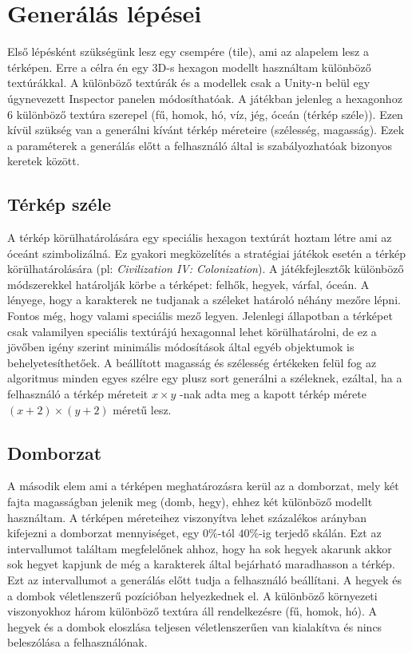 \section{Generálás lépései}

Első lépésként szükségünk lesz egy csempére (tile), ami az alapelem lesz a térképen. Erre a célra én egy 3D-s hexagon modellt használtam különböző textúrákkal. A különböző textúrák és a modellek csak a Unity-n belül egy úgynevezett Inspector panelen módosíthatóak. A játékban jelenleg a hexagonhoz 6 különböző textúra szerepel (fű, homok, hó, víz, jég, óceán (térkép széle)).
\newline
\newline Ezen kívül szükség van a generálni kívánt térkép méreteire (szélesség, magasság). Ezek a paraméterek a generálás előtt a felhasználó által is szabályozhatóak bizonyos keretek között.

\subsection{Térkép széle}

A térkép körülhatárolására egy speciális hexagon textúrát hoztam létre ami az óceánt szimbolizálná. Ez gyakori megközelítés a stratégiai játékok esetén a térkép körülhatárolására (pl: \textit{Civilization IV: Colonization}). A játékfejlesztők különböző módszerekkel határolják körbe a térképet: felhők, hegyek, várfal, óceán. A lényege, hogy a karakterek ne tudjanak a széleket határoló néhány mezőre lépni. Fontos még, hogy valami speciális mező legyen.
\newline
\newline Jelenlegi állapotban a térképet csak valamilyen speciális textúrájú hexagonnal lehet körülhatárolni, de ez a jövőben igény szerint minimális módosítások által egyéb objektumok is behelyetesíthetőek. 
\newline
\newline A beállított magasság és szélesség értékeken felül fog az algoritmus minden egyes szélre egy plusz sort generálni a széleknek, ezáltal, ha a felhasználó a térkép méreteit $x \times y$ -nak adta meg a kapott térkép mérete $(x+2) \times (y+2)$ méretű lesz.

\subsection{Domborzat}

A második elem ami a térképen meghatározásra kerül az a domborzat, mely két fajta magasságban jelenik meg (domb, hegy), ehhez két különböző modellt használtam. A térképen méreteihez viszonyítva lehet százalékos arányban kifejezni a domborzat mennyiséget, egy $0\%$-tól $40\%$-ig terjedő skálán. Ezt az intervallumot találtam megfelelőnek ahhoz, hogy ha sok hegyek akarunk akkor sok hegyet kapjunk de még a karakterek által bejárható maradhasson a térkép. Ezt az intervallumot a generálás előtt tudja a felhasználó beállítani. A hegyek és a dombok véletlenszerű pozícióban helyezkednek el. A különböző környezeti viszonyokhoz három különböző textúra áll rendelkezésre (fű, homok, hó). A hegyek és a dombok eloszlása teljesen véletlenszerűen van kialakítva és nincs beleszólása a felhasználónak.

